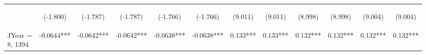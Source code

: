 \documentclass[]{article}
\begin{document}
\begin{center}
\begin{tabular}{lccccccccccc}
        \vspace{4pt}     & \begin{footnotesize}(-1.800)\end{footnotesize} & \begin{footnotesize}(-1.787)\end{footnotesize} & \begin{footnotesize}(-1.787)\end{footnotesize} & \begin{footnotesize}(-1.766)\end{footnotesize} & \begin{footnotesize}(-1.766)\end{footnotesize} & \begin{footnotesize}(9.011)\end{footnotesize}   & \begin{footnotesize}(9.011)\end{footnotesize}   & \begin{footnotesize}(8.998)\end{footnotesize}  & \begin{footnotesize}(8.998)\end{footnotesize}  & \begin{footnotesize}(9.004)\end{footnotesize}  & \begin{footnotesize}(9.004)\end{footnotesize}  \\
        JYear = 8, 1394  & -0.0644***                                     & -0.0642***                                     & -0.0642***                                     & -0.0638***                                     & -0.0638***                                     & 0.133***                                        & 0.133***                                        & 0.132***                                       & 0.132***                                       & 0.132***                                       & 0.132***                                       \\

\end{tabular}
\end{center}
\end{document}
